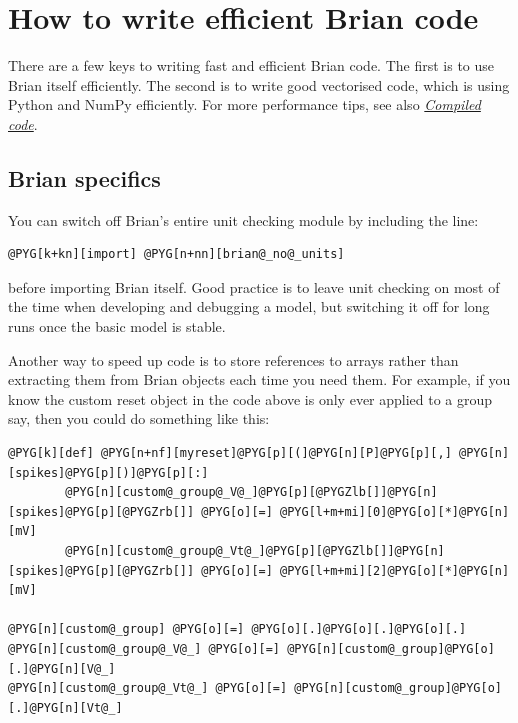 \documentclass[letterpaper,10pt,english]{manual}
\begin{document}
\resetcurrentobjects
\hypertarget{--doc-efficient}{}

\hypertarget{index-3}{}\section{How to write efficient Brian code}

There are a few keys to writing fast and efficient Brian code. The
first is to use Brian itself efficiently. The second is to write
good vectorised code, which is using Python and NumPy efficiently.
For more performance tips, see also \hyperlink{compiled-code}{\emph{Compiled code}}.


\subsection{Brian specifics}

You can switch off Brian's entire unit checking module
by including the line:

\begin{Verbatim}[commandchars=@\[\]]
@PYG[k+kn][import] @PYG[n+nn][brian@_no@_units]
\end{Verbatim}

before importing Brian itself. Good practice is to leave unit checking
on most of the time when developing and debugging a model, but
switching it off for long runs once the basic model is stable.

Another way to speed up code is to store references to arrays rather
than extracting them from Brian objects each time you need them. For
example, if you know the custom reset object in the code above is
only ever applied to a group  say, then you could
do something like this:

\begin{Verbatim}[commandchars=@\[\]]
@PYG[k][def] @PYG[n+nf][myreset]@PYG[p][(]@PYG[n][P]@PYG[p][,] @PYG[n][spikes]@PYG[p][)]@PYG[p][:]
        @PYG[n][custom@_group@_V@_]@PYG[p][@PYGZlb[]]@PYG[n][spikes]@PYG[p][@PYGZrb[]] @PYG[o][=] @PYG[l+m+mi][0]@PYG[o][*]@PYG[n][mV]
        @PYG[n][custom@_group@_Vt@_]@PYG[p][@PYGZlb[]]@PYG[n][spikes]@PYG[p][@PYGZrb[]] @PYG[o][=] @PYG[l+m+mi][2]@PYG[o][*]@PYG[n][mV]

@PYG[n][custom@_group] @PYG[o][=] @PYG[o][.]@PYG[o][.]@PYG[o][.]
@PYG[n][custom@_group@_V@_] @PYG[o][=] @PYG[n][custom@_group]@PYG[o][.]@PYG[n][V@_]
@PYG[n][custom@_group@_Vt@_] @PYG[o][=] @PYG[n][custom@_group]@PYG[o][.]@PYG[n][Vt@_]
\end{Verbatim}
\end{document}
